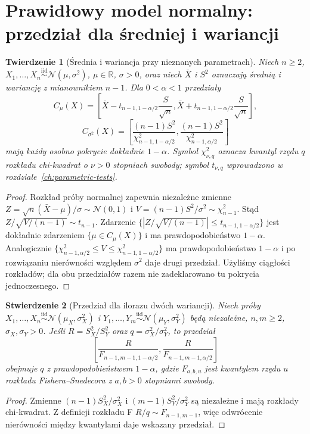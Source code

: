 \documentclass[11pt,a4paper,oneside]{report}
\numberwithin{equation}{chapter}
\theoremstyle{plain}
\newtheorem{twierdzenie}{Twierdzenie}[chapter]
\newtheorem{stwierdzenie}[twierdzenie]{Stwierdzenie}
\theoremstyle{definition}
\theoremstyle{remark}
\newcommand{\R}{\mathbb R}
\newcommand{\Normal}{\mathcal N}
\newcommand{\iid}{\mathrel{\overset{\mathrm{iid}}\sim}}
\begin{document}
\section{Prawidłowy model normalny: przedział dla średniej i wariancji}
\begin{twierdzenie}[Średnia i wariancja przy nieznanych parametrach]
\label{thm:normal-mean-var-ci}
Niech $n\ge2$, $X_1,\ldots,X_n\iid\Normal(\mu,\sigma^2)$,
$\mu\in\R$, $\sigma>0$, oraz niech $\bar X$ i $S^2$ oznaczają
średnią i wariancję z mianownikiem $n-1$. Dla $0<\alpha<1$
przedziały
\[
 C_\mu(X)=\left[\bar X-t_{n-1,1-\alpha/2}\frac{S}{\sqrt n},
 \bar X+t_{n-1,1-\alpha/2}\frac{S}{\sqrt n}\right],
\]
\[
 C_{\sigma^2}(X)=\left[
 \frac{(n-1)S^2}{\chi^2_{n-1,1-\alpha/2}},
 \frac{(n-1)S^2}{\chi^2_{n-1,\alpha/2}}\right]
\]
mają \emph{każdy osobno} pokrycie dokładnie $1-\alpha$.
Symbol $\chi^2_{\nu,q}$ oznacza kwantyl rzędu $q$ rozkładu
chi-kwadrat o $\nu>0$ stopniach swobody; symbol
$t_{\nu,q}$ wprowadzono w rozdziale~\ref{ch:parametric-tests}.
\end{twierdzenie}
\begin{proof}
Rozkład próby normalnej zapewnia niezależne zmienne
$Z=\sqrt n(\bar X-\mu)/\sigma\sim\Normal(0,1)$ i
$V=(n-1)S^2/\sigma^2\sim\chi^2_{n-1}$. Stąd
$Z/\sqrt{V/(n-1)}\sim t_{n-1}$. Zdarzenie
$\{|Z/\sqrt{V/(n-1)}|\le t_{n-1,1-\alpha/2}\}$ jest
dokładnie zdarzeniem $\{\mu\in C_\mu(X)\}$ i ma
prawdopodobieństwo $1-\alpha$. Analogicznie
$\{\chi^2_{n-1,\alpha/2}\le V\le
\chi^2_{n-1,1-\alpha/2}\}$ ma prawdopodobieństwo
$1-\alpha$ i po rozwiązaniu nierówności względem
$\sigma^2$ daje drugi przedział. Użyliśmy ciągłości
rozkładów; dla obu przedziałów razem nie zadeklarowano
tu pokrycia jednoczesnego.
\end{proof}

\begin{stwierdzenie}[Przedział dla ilorazu dwóch wariancji]
\label{prop:ratio-var-ci}
Niech próby $X_1,\ldots,X_n\iid\Normal(\mu_X,\sigma_X^2)$
i $Y_1,\ldots,Y_m\iid\Normal(\mu_Y,\sigma_Y^2)$ będą
niezależne, $n,m\ge2$, $\sigma_X,\sigma_Y>0$.
Jeśli $R=S_X^2/S_Y^2$ oraz $q=\sigma_X^2/\sigma_Y^2$,
to przedział
\[
 \left[\frac{R}{F_{n-1,m-1,1-\alpha/2}},
       \frac{R}{F_{n-1,m-1,\alpha/2}}\right]
\]
obejmuje $q$ z prawdopodobieństwem $1-\alpha$,
gdzie $F_{a,b,u}$ jest kwantylem rzędu $u$
rozkładu Fishera--Snedecora z $a,b>0$ stopniami swobody.
\end{stwierdzenie}
\begin{proof}
Zmienne
$(n-1)S_X^2/\sigma_X^2$ i
$(m-1)S_Y^2/\sigma_Y^2$ są niezależne i mają
rozkłady chi-kwadrat. Z definicji rozkładu F
$R/q\sim F_{n-1,m-1}$, więc odwrócenie nierówności
między kwantylami daje wskazany przedział.
\end{proof}
\end{document}
